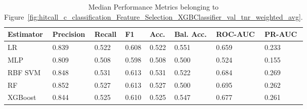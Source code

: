 \begin{longtable}{llllllll}
\caption{Median Performance Metrics belonging to Figure~\ref{fig:hitcall_c_classification_Feature_Selection_XGBClassifier_val_tnr_weighted_avg}.}\label{tab:table:hitcall_c_classification_feature_selection_xgbclassifier_val_tnr_weighted_avg}\\
\toprule
\midrule
\small Estimator & \small Precision & \small Recall & \small F1 & \small Acc. & \small Bal. Acc. & \small ROC-AUC & \small PR-AUC\\
\hline
LR & 0.839 & 0.522 & 0.608 & 0.522 & 0.551 & 0.659 & 0.233\\
MLP & 0.809 & 0.508 & 0.598 & 0.508 & 0.500 & 0.524 & 0.155\\
RBF SVM & 0.848 & 0.531 & 0.613 & 0.531 & 0.522 & 0.684 & 0.269\\
RF & 0.852 & 0.527 & 0.613 & 0.527 & 0.500 & 0.695 & 0.262\\
XGBoost & 0.844 & 0.525 & 0.610 & 0.525 & 0.547 & 0.677 & 0.261\\
\bottomrule
\end{longtable}